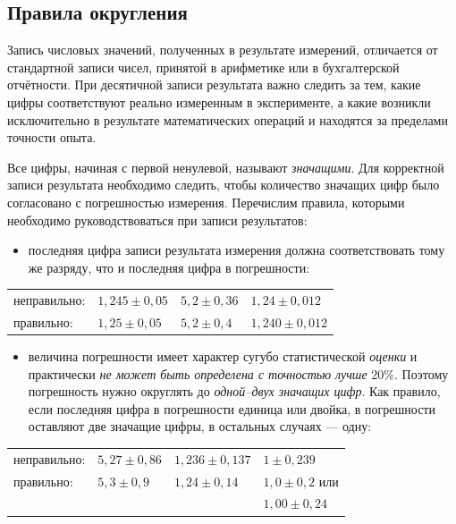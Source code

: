 \subsection{Правила округления}\label{subsec:round}


Запись числовых значений, полученных в результате измерений, отличается
от стандартной записи чисел, принятой в арифметике или в бухгалтерской
отчётности. При десятичной записи результата важно следить за тем,
какие цифры соответствуют реально измеренным в эксперименте, а какие
возникли исключительно в результате математических операций и находятся
за пределами точности опыта.

Все цифры, начиная с первой ненулевой, называют \emph{значащими}.
Для корректной записи результата необходимо следить, чтобы количество
значащих цифр было согласовано с погрешностью измерения. Перечислим
правила, которыми необходимо руководствоваться при записи результатов:
\begin{itemize}
\item последняя цифра записи результата измерения должна соответствовать
тому же разряду, что и последняя цифра в погрешности:
\end{itemize}
\noindent%
\begin{tabular}{llll}
    \color{red}неправильно:  &
    \color{red}$1{,}245\pm0{,}05$  &
    \color{red}$5{,}2\pm0{,}36$  &
    \color{red}$1{,}24\pm0{,}012$\\
правильно:  & $1{,}25\pm0{,}05$  & $5{,}2\pm0{,}4$  & $1{,}240\pm0{,}012$
\end{tabular}
\begin{itemize}
\item величина погрешности имеет характер сугубо статистической \emph{оценки}
и практически \emph{не может быть определена с точностью лучше} 20\%.
Поэтому погрешность нужно округлять до \emph{одной--двух
значащих цифр}. Как правило, если последняя цифра в погрешности единица
или двойка, в погрешности оставляют две значащие цифры, в остальных
случаях --- одну:
\end{itemize}
\noindent%
\begin{tabular}{llll}
\color{red}неправильно:  &
\color{red}$5{,}27\pm0{,}86$  &
\color{red}$1{,}236\pm0{,}137$  &
\color{red}$1\pm0{,}239$\\
правильно:  & $5{,}3\pm0{,}9$ & $1{,}24\pm0{,}14$ & $1{,}0\pm0{,}2$ или\\
 &  &  & $1{,}00\pm0{,}24$
\end{tabular}

